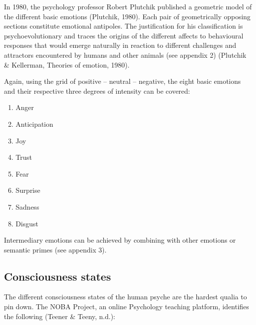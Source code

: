 \noindent In 1980, the psychology professor Robert Plutchik published a geometric model of the different basic emotions  (Plutchik, 1980). Each pair of geometrically opposing sections constitute emotional antipoles. The justification for his classification is psychoevolutionary and traces the origins of the different affects to behavioural responses that would emerge naturally in reaction to different challenges and attractors encountered by humans and other animals (see appendix 2) (Plutchik \& Kellerman, Theories of emotion, 1980).  

Again, using the grid of positive – neutral – negative, the eight basic emotions and their respective three degrees of intensity can be covered: 

\begin{enumerate}
\item   Anger 

\item   Anticipation 

\item   Joy 

\item   Trust 

\item   Fear 

\item   Surprise 
	
\item   Sadness 

\item   Disgust
\end{enumerate}

\noindent Intermediary emotions can be achieved by combining with other emotions or semantic primes (see appendix 3). 

\subsection{Consciousness states}

The different consciousness states of the human psyche are the hardest qualia to pin down. The NOBA Project, an online Psychology teaching platform, identifies the following (Teener \& Teeny, n.d.): 

